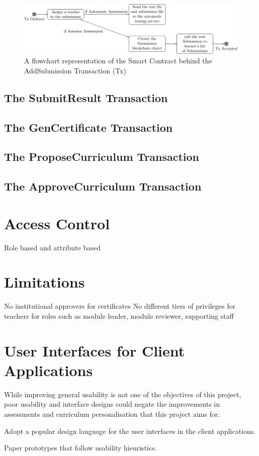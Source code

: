 \begin{figure}[!ht]
    \centering
    \includegraphics[width=1.0\textwidth]{astx}
    \caption{A flowchart representation of the Smart Contract behind the AddSubmission Transaction (Tx)} \label{fig:astx}
\end{figure}

\subsection{The SubmitResult Transaction}

\subsection{The GenCertificate Transaction}

\subsection{The ProposeCurriculum Transaction}

\subsection{The ApproveCurriculum Transaction}


\section{Access Control}
Role based and attribute based

\section{Limitations}
No institutional approvers for certificates
No different tiers of privileges for teachers for roles such as module leader, module reviewer, supporting staff

\section{User Interfaces for Client Applications}

While improving general usability is not one of the objectives of this project, poor usability and interface designs 
could negate the improvements in assessments and curriculum personalisation that this project aims for.

Adopt a popular design language for the user interfaces in the client applications.

Paper prototypes that follow usability hieuristics.